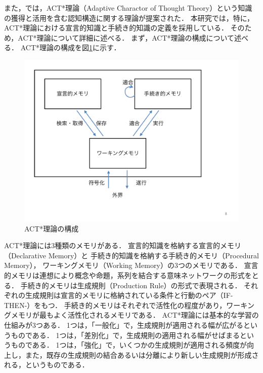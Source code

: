 また，\cite{anderson1982acquisition, anderson1990adaptive}では，ACT*理論（Adaptive Charactor of Thought Theory）という知識の獲得と活用を含む認知構造に関する理論が提案された．
本研究では，特に，ACT*理論における宣言的知識と手続き的知識の定義を採用している．
そのため，ACT*理論について詳細に述べる．
まず，ACT*理論の構成について述べる．
ACT*理論の構成を図\ref{fig:act}に示す．
\begin{figure}[htb]
\begin{center}
\includegraphics[width=350pt]{./img/ACT2.pdf}
\end{center}
\caption{ACT*理論の構成}
\label{fig:act}
\end{figure}
%
ACT*理論には3種類のメモリがある．
宣言的知識を格納する宣言的メモリ（Declarative Memory）と
手続き的知識を格納する手続き的メモリ（Procedural Memory），
ワーキングメモリ（Working Memory）の3つのメモリである．
宣言的メモリは連想により概念や命題，系列を結合する意味ネットワークの形式をとる．
手続き的メモリは生成規則（Production Rule）の形式で表現される．
それぞれの生成規則は宣言的メモリに格納されている条件と行動のペア（IF-THEN-）をもつ．
手続き的メモリはそれぞれで活性化の程度があり，ワーキングメモリが最もよく活性化されるメモリである．
ACT*理論には基本的な学習の仕組みが3つある．
1つは，「一般化」で，生成規則が適用される幅が広がるというものである．
1つは，「差別化」で，生成規則の適用される幅がせばまるというものである．
1つは，「強化」で，いくつかの生成規則が適用される頻度が向上し，また，既存の生成規則の結合あるいは分離により新しい生成規則が形成される，というものである．

